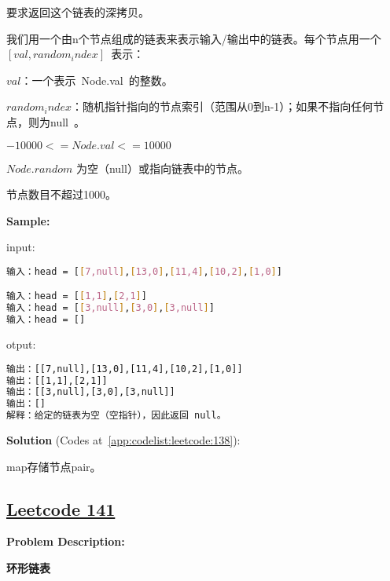 要求返回这个链表的深拷贝。 \par

我们用一个由n个节点组成的链表来表示输入/输出中的链表。每个节点用一个 $ [val, random_index] $ 表示：\par

$ val $：一个表示 Node.val 的整数。\par
$ random_index $：随机指针指向的节点索引（范围从0到n-1）；如果不指向任何节点，则为null 。\par

$ -10000 <= Node.val <= 10000 $\par

$ Node.random $ 为空（null）或指向链表中的节点。\par

节点数目不超过1000。\par


\textbf{Sample:}\par

input:\par

\begin{lstlisting}[language=bash]
输入：head = [[7,null],[13,0],[11,4],[10,2],[1,0]]

输入：head = [[1,1],[2,1]]
输入：head = [[3,null],[3,0],[3,null]]
输入：head = []
\end{lstlisting}

otput:\par

\begin{lstlisting}[language=bash]
输出：[[7,null],[13,0],[11,4],[10,2],[1,0]]
输出：[[1,1],[2,1]]
输出：[[3,null],[3,0],[3,null]]
输出：[]
解释：给定的链表为空（空指针），因此返回 null。
\end{lstlisting}

\textbf{Solution }(Codes at~\ref{app:codelist:leetcode:138}):\par

map存储节点pair。\par



\subsection{\href{https://leetcode-cn.com/}{Leetcode 141}}\label{app:problemlist:leetcode:141}

\textbf{Problem Description:}\par

\textbf{环形链表}\par

